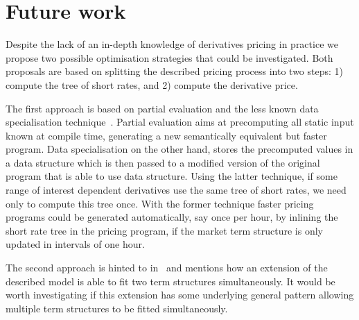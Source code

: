 \section{Future work}

Despite the lack of an in-depth knowledge of derivatives
pricing in practice we propose two possible optimisation
strategies that could be investigated. Both proposals are
based on splitting the described pricing process into two
steps: 1) compute the tree of short rates, and 2) compute
the derivative price.

The first approach is based on partial evaluation and the
less known data specialisation
technique~\cite{malmkjaer,chirokoff}. Partial evaluation
aims at precomputing all static input known at compile time,
generating a new semantically equivalent but faster
program. Data specialisation on the other hand, stores the
precomputed values in a data structure which is then passed
to a modified version of the original program that is able
to use data structure. Using the latter technique, if some
range of interest dependent derivatives use the same tree of
short rates, we need only to compute this tree once. With
the former technique faster pricing programs could be
generated automatically, say once per hour, by inlining the
short rate tree in the pricing program, if the market term
structure is only updated in intervals of one hour.

The second approach is hinted to in~\cite{HullWhite94} and
mentions how an extension of the described model is able to
fit two term structures simultaneously. It would be worth
investigating if this extension has some underlying general
pattern allowing multiple term structures to be fitted
simultaneously.
